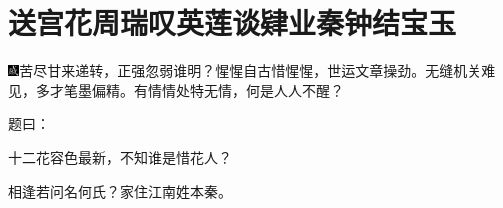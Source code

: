 

\chapter{送宫花周瑞叹英莲\hspace{.5em}谈肄业秦钟结宝玉}

{\includegraphics[width=3mm]{../Images/00005}苦尽甘来递转，正强忽弱谁明？惺惺自古惜惺惺，世运文章操劲。无缝机关难见，多才笔墨偏精。有情情处特无情，何是人人不醒？}

题曰：

十二花容色最新，不知谁是惜花人？

相逢若问名何氏？家住江南姓本秦。

